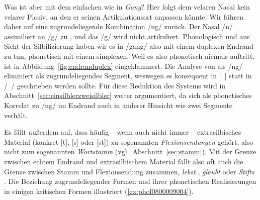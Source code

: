 Was ist aber mit dem einfachen \textipa{[N]} wie in \textit{Gang}?
Hier folgt dem velaren Nasal kein velarer Plosiv, an den er seinen Artikulationsort anpassen könnte.
Wir führen \textipa{[N]} daher auf eine zugrundeliegende Kombination /ng/ zurück.
Der Nasal /n/ assimiliert an /g/ zu \textipa{[N]}, und das /g/ wird nicht artikuliert. 
Phonologisch und aus Sicht der Silbifizierung haben wir es \zB in /gang/ also mit einem duplexen Endrand zu tun, phonetisch mit einem simplexen.
Weil es also phonetisch niemals auftritt, ist \textipa{[g]} in Abbildung~\ref{fig:endranduplex} eingeklammert.
Die Analyse von \textipa{[N]} als /ng/ eliminiert \textipa{[N]} als zugrundeliegendes Segment, weswegen es konsequent in [~] statt in /~/ geschrieben werden sollte.
Für diese Reduktion des Systems wird in Abschnitt~\ref{sec:einsilblerzweisilbler} weiter argumentiert, da sich \textipa{[N]} als phonetisches Korrelat zu /ng/ im Endrand auch in anderer Hinsicht wie zwei Segmente verhält.

Es fällt außerdem auf, dass häufig -- wenn auch nicht immer -- extrasilbisches Material (konkret [t], [s] oder [st]) zu sogenannten \textit{Flexionsendungen} gehört, also nicht zum sogenannten \textit{Wortstamm} (vgl.\ Abschnitt~\ref{sec:stamm}).
Mit der Grenze zwischen echtem Endrand und extrasilbischem Material fällt also oft auch die Grenze zwischen Stamm und Flexionsendung zusammen, \zB \textit{lebst} \textipa{[le:p+st]}, \textit{glaubt} \textipa{[gl\t{aO}p+t]} oder \textit{Stifts} \textipa{[StIft+s]}.
Die Beziehung zugrundeliegender Formen und ihrer phonetischen Realisierungen in einigen kritischen Formen illustriert (\ref{ex:phol0800009004}).

\begin{exe}
  \ex \label{ex:phol0800009004}
  \begin{xlist}
  \end{xlist}
\end{exe}

